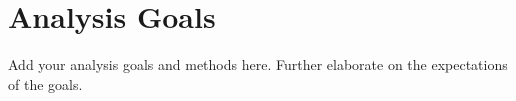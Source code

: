 \section{Analysis Goals}
Add your analysis goals and methods here. Further elaborate on the expectations of the goals.\\